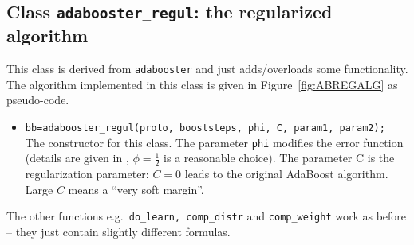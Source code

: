\documentclass{article}
\begin{document}
\subsection{Class {\tt adabooster\_regul}: the regularized algorithm}
This class is derived from {\tt adabooster} and just adds/overloads some
functionality. The algorithm implemented in this class is given in
Figure~\ref{fig:ABREGALG} as pseudo-code.
\begin{itemize}
\item {\tt bb=adabooster\_regul(proto, booststeps, phi, C, param1, param2);}\\
  The constructor for this class. The parameter {\tt phi} modifies the error
  function (details are given in \cite{RaeOnoMue00a}, $\phi=\frac{1}{2}$ is a
  reasonable choice). The parameter C is the regularization parameter: $C=0$
  leads to the original AdaBoost algorithm. Large $C$ means a ``very soft
  margin''.
\end{itemize}
The other functions e.g.~{\tt do\_learn, comp\_distr} and {\tt comp\_weight} work
as before -- they just contain slightly different formulas.
\end{document}
